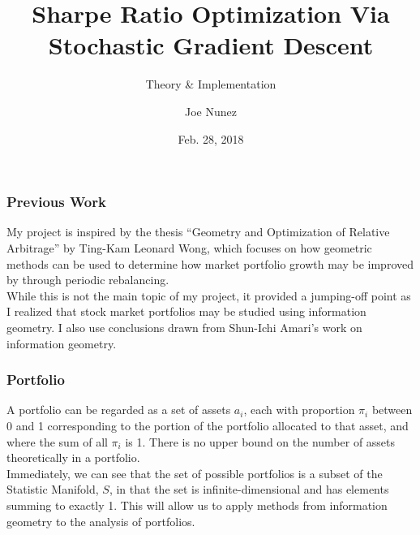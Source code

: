 \documentclass{beamer}
\title{Sharpe Ratio Optimization Via Stochastic Gradient Descent}
\subtitle{Theory \& Implementation}
\author{Joe Nunez}
\institute{Harvey Mudd College}
\date{Feb. 28, 2018}
\begin{document}
\begin{frame}
\titlepage
\end{frame}

\begin{frame}
\frametitle{Previous Work}
My project is inspired by the thesis ``Geometry and Optimization of Relative Arbitrage'' by Ting-Kam Leonard Wong, which focuses on how geometric methods can be used to determine how market portfolio growth may be improved by through periodic rebalancing.
\vspace{.1in}
\\While this is not the main topic of my project, it provided a jumping-off point as I realized that stock market portfolios may be studied using information geometry.  I also use conclusions drawn from Shun-Ichi Amari's work on information geometry.
\end{frame}


\begin{frame}
\frametitle{Portfolio}
A portfolio can be regarded as a set of assets $a_i$, each with proportion $\pi_i$ between 0 and 1 corresponding to the portion of the portfolio allocated to that asset, and where the sum of all $\pi_i$ is 1.  There is no upper bound on the number of assets theoretically in a portfolio.
\vspace{.1in}
\\Immediately, we can see that the set of possible portfolios is a subset of the Statistic Manifold, $S$, in that the set is infinite-dimensional and has elements summing to exactly 1.  This will allow us to apply methods from information geometry to the analysis of portfolios.
\end{frame}
\end{document}

